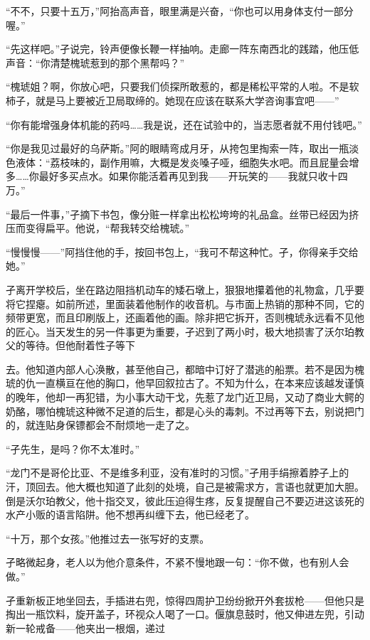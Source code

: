 \documentclass{article}
\begin{document}
“不不，只要十五万，”阿抬高声音，眼里满是兴奋，“你也可以用身体支付一部分喔。”

“先这样吧。”孑说完，铃声便像长鞭一样抽响。走廊一阵东南西北的践踏，他压低声音：“你清楚槐琥惹到的那个黑帮吗？”

\newpage 



“槐琥姐？啊，你放心吧，只要我们侦探所敢惹的，都是稀松平常的人啦。不是软柿子，就是马上要被近卫局取缔的。她现在应该在联系大学咨询事宜吧——”

“你有能增强身体机能的药吗……我是说，还在试验中的，当志愿者就不用付钱吧。”

“你是我见过最好的乌萨斯。”阿的眼睛弯成月牙，从挎包里掏索一阵，取出一瓶淡色液体：“荔枝味的，副作用嘛，大概是发炎嗓子哑，细胞失水吧。而且屁量会增多……你最好多买点水。如果你能活着再见到我——开玩笑的——我就只收十四万。”

“最后一件事，”孑摘下书包，像分赃一样拿出松松垮垮的礼品盒。丝带已经因为挤压而变得扁平。他说，“帮我转交给槐琥。”

“慢慢慢——”阿挡住他的手，按回书包上，“我可不帮这种忙。孑，你得亲手交给她。”

孑离开学校后，坐在路边阻挡机动车的矮石墩上，狠狠地攥着他的礼物盒，几乎要将它捏瘪。如前所述，里面装着他制作的收音机。与市面上热销的那种不同，它的频带更宽，而且印刷版上，还画着他的画。除非把它拆开，否则槐琥永远看不见他的匠心。当天发生的另一件事更为重要，孑迟到了两小时，极大地损害了沃尔珀教父的等待。但他耐着性子等下

\newpage 

去。他知道内部人心涣散，甚至他自己，都暗中订好了潜逃的船票。若不是因为槐琥的仇一直横亘在他的胸口，他早回叙拉古了。不知为什么，在本来应该越发谨慎的晚年，他却一再犯错，为小事大动干戈，先惹了龙门近卫局，又动了商业大鳄的奶酪，哪怕槐琥这种微不足道的后生，都是心头的毒刺。不过再等下去，别说把门的，就连贴身保镖都会不耐烦地一走了之。

“孑先生，是吗？你不太准时。”

“龙门不是哥伦比亚、不是维多利亚，没有准时的习惯。”孑用手绢擦着脖子上的汗，顶回去。他大概也知道了此刻的处境，自己是被需求方，言语也就更加大胆。倒是沃尔珀教父，他十指交叉，彼此压迫得生疼，反复提醒自己不要迈进这该死的水产小贩的语言陷阱。他不想再纠缠下去，他已经老了。

“十万，那个女孩。”他推过去一张写好的支票。

孑略微起身，老人以为他介意条件，不紧不慢地跟一句：“你不做，也有别人会做。”

孑重新板正地坐回去，手插进右兜，惊得四周护卫纷纷掀开外套拔枪——但他只是掏出一瓶饮料，旋开盖子，环视众人喝了一口。偃旗息鼓时，他又伸进左兜，引动新一轮戒备——他夹出一根烟，递过
\end{document}
